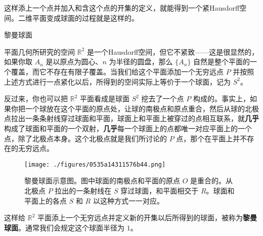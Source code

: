 这样添上一个点并加入和含这个点的开集的定义，就能得到一个紧Hausdorff空间。二维平面变成球面的过程就是这样的。

\begin{example}{黎曼球面}\label{ex_Topo5_1}

平面几何所研究的空间 $\mathbb{R}^2$ 是一个Hausdorff空间，但它不紧致——这是很显然的，如果你取 $A_n$ 是以原点为圆心、$n$ 为半径的圆盘，那么 $\{A_n\}$ 自然是整个平面的一个覆盖，而它不存在有限子覆盖。当我们给这个平面添加一个无穷远点 $P$ 并按照上述方式进行一点紧化以后，所得到的空间实际上等价于一个球面，记为 $S^2$。

反过来，你也可以把 $\mathbb{R}^2$ 平面看成是球面 $S^2$ 挖去了一个点 $P$ 构成的。事实上，如果你把一个球放在这个平面的原点处，让球的南极点和原点重合，然后从球的北极点拉出一条条射线穿过球面和平面，球面上和平面上被穿过的点相互联系，就\textbf{几乎}构成了球面和平面的一个双射，\textbf{几乎}每一个球面上的点都唯一对应平面上的一个点，除了北极点本身。这个北极点就是我们所讨论的 $P$ 点，那个在平面上并不存在的无穷远点。

\begin{figure}[ht]
\centering
\texttt{[image: ./figures/0535a14311576b44.png]}
\caption{黎曼球面示意图。图中球面的南极点和平面的原点 $O$ 是重合的。从北极点 $P$ 拉出的一条射线在 $S$ 穿过球面，和平面相交于 $R$。球面和平面上的各点 $S$ 和 $R$ 以这种方式一一对应。} \label{fig_Topo5_1}
\end{figure}

这样给 $\mathbb{R}^2$ 平面添上一个无穷远点并定义新的开集以后所得到的球面，被称为\textbf{黎曼球面}。通常我们会规定这个球面半径为 $1$。
\end{example}



